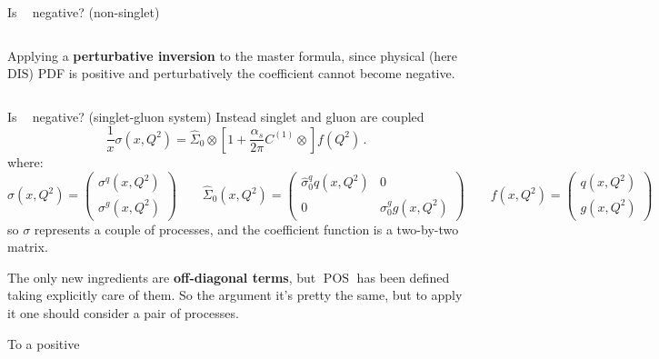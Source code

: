 \documentclass[8pt]{beamer}
\DeclareMathOperator{\msbar}{\overline{MS}}
\DeclareMathOperator{\pos}{POS}
\begin{document}
\begin{frame}{Is $\msbar$ negative? (non-singlet)}
\begin{columns}
\begin{column}{0.45\textwidth}
            Applying a \textbf{perturbative inversion} to the master formula,
            since physical (here $\text{DIS}$) PDF is
            positive and perturbatively the coefficient
            cannot become negative\footnotemark.\\
        \end{column}
    \end{columns}
\end{frame}

\begin{frame}{Is $\msbar$ negative? (singlet-gluon system)}
    Instead singlet and gluon are coupled
    \begin{equation*}
        \frac{1}{x} \sigma(x,Q^2)= \hat \Sigma_0\otimes \left[1
        +\frac{\alpha_s}{2\pi}  C^{(1)} \otimes \right] f(Q^2) \,.
    \end{equation*}
    where:
    \begin{equation*}
        \sigma(x,Q^2)=\left(\begin{array}{c} \sigma^{q}(x,Q^2)\\ \sigma^{g} (x,Q^2)\end{array}\right) \qquad
        \hat \Sigma_0(x,Q^2)=\left(\begin{array}{cc} \hat \sigma_0^{q} q (x,Q^2) &
                  0 \\0 & \sigma_0^{g} g (x,Q^2) \end{array}\right) \qquad
          f(x,Q^2)=\left(\begin{array}{c} q(x,Q^2) \\ g(x,Q^2) \end{array}\right)
    \end{equation*}
    so $\sigma$ represents a couple of processes, and the coefficient function
    is a two-by-two matrix.

    The only new ingredients are \textbf{off-diagonal terms}, but $\pos$ has
    been defined taking explicitly care of them.
    So the argument it's pretty the same, but to apply it one should consider a
    pair of processes.

    \vspace*{15pt}
    \begin{block}{To a positive $\msbar$}
    \vspace*{1pt}


\end{block}
\end{frame}
\end{document}
